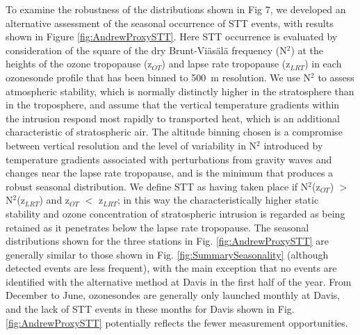 \documentclass{article}
\begin{document}
  
  To examine the robustness of the distributions shown in Fig 7, we developed an alternative assessment of the seasonal occurrence of STT events, with results shown in Figure \ref{fig:AndrewProxySTT}.
  Here STT occurrence is evaluated by consideration of the square of the dry Brunt-Viäsälä frequency (N$^2$) at the heights of the ozone tropopause (z$_{OT}$) and lapse rate tropopause (z$_{LRT}$) in each ozonesonde profile that has been binned to 500~m resolution.
  We use N$^2$ to assess atmospheric stability, which is normally distinctly higher in the stratosphere than in the troposphere, and assume that the vertical temperature gradients within the intrusion respond most rapidly to transported heat, which is an additional characteristic of stratospheric air.
  The altitude binning chosen is a compromise between vertical resolution and the level of variability in N$^2$ introduced by temperature gradients associated with perturbations from gravity waves and changes near the lapse rate tropopause, and is the minimum that produces a robust seasonal distribution.
  We define STT as having taken place if N$^2$(z$_{OT}$) $>$ N$^2$(z$_{LRT}$) and z$_{OT}$ $<$ z$_{LRT}$; in this way the characteristically higher static stability and ozone concentration of stratospheric intrusion is regarded as being retained as it penetrates below the lapse rate tropopause. 
  The seasonal distributions shown for the three stations in Fig. \ref{fig:AndrewProxySTT} are generally similar to those shown in Fig. \ref{fig:SummarySeasonality} (although detected events are less frequent), with the main exception that no events are identified with the alternative method at Davis in the first half of the year.
  From December to June, ozonesondes are generally only launched monthly at Davis, and the lack of STT events in these months for Davis shown in Fig. \ref{fig:AndrewProxySTT} potentially reflects the fewer measurement opportunities.
  
\end{document}
